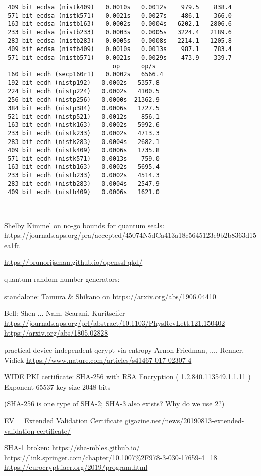 \documentclass[%
 aip,
 jmp,%
 amsmath,amssymb,
 reprint,%
]{revtex4-1}
\begin{document}
\begin{verbatim}
 409 bit ecdsa (nistk409)   0.0010s   0.0012s    979.5    838.4
 571 bit ecdsa (nistk571)   0.0021s   0.0027s    486.1    366.0
 163 bit ecdsa (nistb163)   0.0002s   0.0004s   6202.1   2806.6
 233 bit ecdsa (nistb233)   0.0003s   0.0005s   3224.4   2189.6
 283 bit ecdsa (nistb283)   0.0005s   0.0008s   2214.1   1205.8
 409 bit ecdsa (nistb409)   0.0010s   0.0013s    987.1    783.4
 571 bit ecdsa (nistb571)   0.0021s   0.0029s    473.9    339.7
                              op      op/s
 160 bit ecdh (secp160r1)   0.0002s   6566.4
 192 bit ecdh (nistp192)   0.0002s   5357.8
 224 bit ecdh (nistp224)   0.0002s   4100.5
 256 bit ecdh (nistp256)   0.0000s  21362.9
 384 bit ecdh (nistp384)   0.0006s   1727.5
 521 bit ecdh (nistp521)   0.0012s    856.1
 163 bit ecdh (nistk163)   0.0002s   5992.6
 233 bit ecdh (nistk233)   0.0002s   4713.3
 283 bit ecdh (nistk283)   0.0004s   2682.1
 409 bit ecdh (nistk409)   0.0006s   1735.8
 571 bit ecdh (nistk571)   0.0013s    759.0
 163 bit ecdh (nistb163)   0.0002s   5695.4
 233 bit ecdh (nistb233)   0.0002s   4514.3
 283 bit ecdh (nistb283)   0.0004s   2547.9
 409 bit ecdh (nistb409)   0.0006s   1621.0
\end{verbatim}

=============================================

Shelby Kimmel on no-go bounds for quantum seals:
\url{https://journals.aps.org/pra/accepted/45074N5dCa413a18c5645123e9b2b8363d15ea1fc}

\url{https://brunorijsman.github.io/openssl-qkd/}

quantum random number generators:

standalone: Tamura \& Shikano on 
\url{https://arxiv.org/abs/1906.04410}

Bell:
Shen ... Nam, Scarani, Kuritseifer
\url{https://journals.aps.org/prl/abstract/10.1103/PhysRevLett.121.150402}
\url{https://arxiv.org/abs/1805.02828}

practical device-independent qcrypt via entropy
Arnon-Friedman, ..., Renner, Vidick
\url{https://www.nature.com/articles/s41467-017-02307-4}

WIDE PKI certificate:
SHA-256 with RSA Encryption ( 1.2.840.113549.1.1.11 )
Exponent 65537
key size 2048 bits

(SHA-256 is one type of SHA-2; SHA-3 also exists? Why do we use 2?)

EV = Extended Validation Certificate
\url{gigazine.net/news/20190813-extended-validation-certificate/}

SHA-1 broken:
\url{https://sha-mbles.github.io/}
\url{https://link.springer.com/chapter/10.1007%2F978-3-030-17659-4_18}
\url{https://eurocrypt.iacr.org/2019/program.html}
\end{document}
